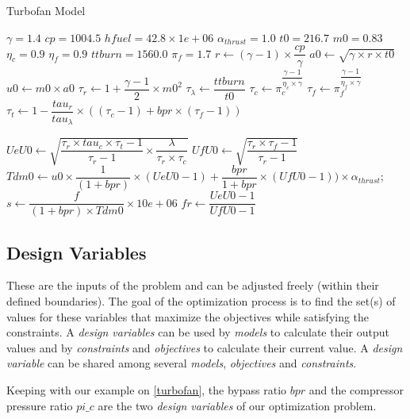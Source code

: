\begin{algorithm}
\caption{Turbofan Model}
\label{algo_turbofan}

	\;
	$\gamma =1.4$\;
	$cp = 1004.5$\;
	$hfuel = 42.8 \times 1e+06$\;
	$\alpha_{thrust} 	= 1.0$\;
	$t0 		= 216.7$\;
	$m0 		= 0.83$\;
	$\eta_c 		= 0.9$\;
	$\eta_f 		= 0.9$\;
	$ttburn 		= 1560.0$\;
	$\pi_f 		= 1.7$\;
	\;
	$r	\leftarrow (\gamma-1) \times \dfrac{cp}{\gamma}$\;
	$a0	\leftarrow \sqrt{\gamma \times r \times t0}$\;
	$u0	\leftarrow m0 \times a0$\;
	$\tau_r	\leftarrow 1+\dfrac{\gamma-1}{2} \times m0^2$\;
	$\tau_\lambda \leftarrow \dfrac{ttburn}{t0}$\;
	$\tau_c	\leftarrow \pi_c^{\dfrac{\gamma-1}{\eta_c \times \gamma}}$\;
	$\tau_f	\leftarrow \pi_f^{\dfrac{\gamma-1}{\eta_f \times \gamma}}$\;
	$\tau_t	\leftarrow 1-\dfrac{tau_r}{tau_\lambda} \times ((\tau_c-1)+bpr \times (\tau_f-1))$\;

	$UeU0	\leftarrow \sqrt{\dfrac{\tau_r \times tau_c \times \tau_t-1}{\tau_r-1} \times \dfrac{\lambda}{\tau_r \times \tau_c}}$\;
	$UfU0	\leftarrow \sqrt{\dfrac{\tau_r \times \tau_f-1}{\tau_r-1}}$\;
	\;
	$Tdm0	\leftarrow u0 \times \dfrac{1}{(1+bpr)} \times (UeU0-1)+\dfrac{bpr}{1+bpr} \times (UfU0-1)) \times \alpha_{thrust}$;
	$s	\leftarrow \dfrac{f}{(1+bpr) \times Tdm0} \times 10e+06$\;
	$fr	\leftarrow \dfrac{UeU0-1}{UfU0-1}$\;

\end{algorithm}

\subsection{Design Variables}

These are the inputs of the problem and can be adjusted freely (within their defined boundaries). The goal of the optimization process is to find the set(s) of values for these variables that maximize the objectives while satisfying the constraints. A \emph{design variables} can be used by \emph{models} to calculate their output values and by \emph{constraints} and \emph{objectives} to calculate their current value. A \emph{design variable} can be shared among several \emph{models}, \emph{objectives} and \emph{constraints}.

Keeping with our example on \figurename{} \ref{turbofan}, the bypass ratio $bpr$ and the compressor pressure ratio $pi\_c$ are the two \emph{design variables} of our optimization problem.

